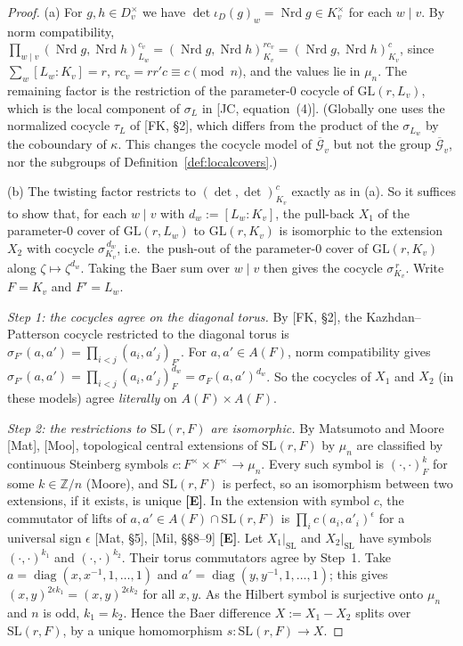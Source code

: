 \documentclass[12pt]{article}
\newcommand{\ov}[1]{\overline{#1}}
\newcommand{\Z}{\mathbb{Z}}
\newcommand{\Nrd}{\operatorname{Nrd}}
\newcommand{\diag}{\operatorname{diag}}
\newcommand{\GL}{\mathrm{GL}}
\newcommand{\SL}{\mathrm{SL}}
\newcommand{\cGb}{\ov{\mathcal{G}}}
\newcommand{\iD}{\iota_D}
\newcommand{\Ev}{\textbf{[E]}}
\theoremstyle{plain}
\theoremstyle{definition}
\begin{document}
\begin{proof}
(a) For $g,h\in D_v^\times$ we have $\det\iD(g)_w=\Nrd g\in K_v^\times$ for each $w\mid v$. By norm compatibility, $\prod_{w\mid v}(\Nrd g,\Nrd h)_{L_w}^{c_v}=(\Nrd g,\Nrd h)_{K_v}^{rc_v}=(\Nrd g,\Nrd h)_{K_v}^{c}$, since $\sum_w[L_w:K_v]=r$, $rc_v=rr'c\equiv c\pmod n$, and the values lie in $\mu_n$. The remaining factor is the restriction of the parameter-$0$ cocycle of $\GL(r,L_v)$, which is the local component of $\sigma_L$ in [JC, equation~(4)]. (Globally one uses the normalized cocycle $\tau_L$ of [FK, \S2], which differs from the product of the $\sigma_{L_w}$ by the coboundary of $\kappa$. This changes the cocycle model of $\cGb_v$ but not the group $\cGb_v$, nor the subgroups of Definition~\ref{def:localcovers}.)

(b) The twisting factor restricts to $(\det,\det)_{K_v}^{c}$ exactly as in (a). So it suffices to show that, for each $w\mid v$ with $d_w:=[L_w:K_v]$, the pull-back $X_1$ of the parameter-$0$ cover of $\GL(r,L_w)$ to $\GL(r,K_v)$ is isomorphic to the extension $X_2$ with cocycle $\sigma_{K_v}^{\,d_w}$, i.e.\ the push-out of the parameter-$0$ cover of $\GL(r,K_v)$ along $\zeta\mapsto\zeta^{d_w}$. Taking the Baer sum over $w\mid v$ then gives the cocycle $\sigma_{K_v}^{\,r}$. Write $F=K_v$ and $F'=L_w$.

\emph{Step 1: the cocycles agree on the diagonal torus.} By [FK, \S2], the Kazhdan--Patterson cocycle restricted to the diagonal torus is $\sigma_{F'}(a,a')=\prod_{i<j}(a_i,a'_j)_{F'}$. For $a,a'\in A(F)$, norm compatibility gives $\sigma_{F'}(a,a')=\prod_{i<j}(a_i,a'_j)_F^{d_w}=\sigma_F(a,a')^{d_w}$. So the cocycles of $X_1$ and $X_2$ (in these models) agree \emph{literally} on $A(F)\times A(F)$.

\emph{Step 2: the restrictions to $\SL(r,F)$ are isomorphic.} By Matsumoto and Moore [Mat], [Moo], topological central extensions of $\SL(r,F)$ by $\mu_n$ are classified by continuous Steinberg symbols $c:F^\times\times F^\times\to\mu_n$. Every such symbol is $(\cdot,\cdot)_F^{k}$ for some $k\in\Z/n$ (Moore), and $\SL(r,F)$ is perfect, so an isomorphism between two extensions, if it exists, is unique \Ev. In the extension with symbol $c$, the commutator of lifts of $a,a'\in A(F)\cap\SL(r,F)$ is $\prod_ic(a_i,a'_i)^{\epsilon}$ for a universal sign $\epsilon$ [Mat, \S5], [Mil, \S\S8--9] \Ev. Let $X_1|_{\SL}$ and $X_2|_{\SL}$ have symbols $(\cdot,\cdot)^{k_1}$ and $(\cdot,\cdot)^{k_2}$. Their torus commutators agree by Step~1. Take $a=\diag(x,x^{-1},1,\dots,1)$ and $a'=\diag(y,y^{-1},1,\dots,1)$; this gives $(x,y)^{2\epsilon k_1}=(x,y)^{2\epsilon k_2}$ for all $x,y$. As the Hilbert symbol is surjective onto $\mu_n$ and $n$ is odd, $k_1=k_2$. Hence the Baer difference $X:=X_1-X_2$ splits over $\SL(r,F)$, by a unique homomorphism $s:\SL(r,F)\to X$.


\end{proof}
\end{document}
